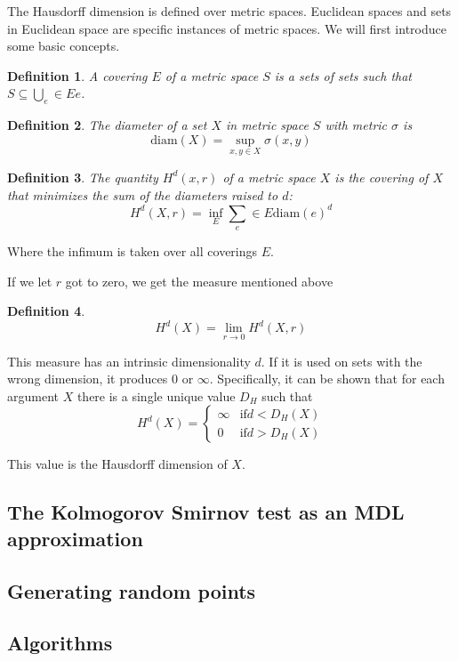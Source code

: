 \documentclass[11pt]{article}
\newtheorem{dfn}{Definition}
\begin{document}
The Hausdorff dimension is defined over metric spaces. Euclidean spaces and sets in Euclidean space are specific instances of metric spaces. We will first introduce some basic concepts.

\begin{dfn}
A covering $E$ of a metric space $S$ is a sets of sets such that $S \subseteq\bigcup_e \in E e$. 
\end{dfn}

\begin{dfn}
The diameter of a set $X$ in metric space $S$ with metric $\sigma$ is
\[
\mbox{diam}(X) = \sup_{x, y \in X}\sigma(x, y)
\]
\end{dfn}

\begin{dfn}
The quantity $H^d(x, r)$ of a metric space $X$ is the covering of $X$ that minimizes the sum of the diameters raised to $d$:
\[
H^d(X, r) = \inf_E \sum_e \in E \mbox{diam}(e)^d
\]  
\end{dfn}

Where the infimum is taken over all coverings $E$.

If we let $r$ got to zero, we get the measure mentioned above

\begin{dfn}
\[
H^d(X) = \lim_{r \rightarrow 0} H^d(X, r)
\] 
\end{dfn}

This measure has an intrinsic dimensionality $d$. If it is used on sets with the wrong dimension, it produces $0$ or $\infty$. Specifically, it can be shown that for each argument $X$ there is a single unique value $D_H$ such that 
\[
H^d(X) = \left \{ 
\begin{array}{rl}
  \infty &\mbox{if} d < D_H(X) \\
  0 &\mbox{if} d > D_H(X)
\end{array} \right.
\]

This value is the Hausdorff dimension of $X$.

\subsection{The Kolmogorov Smirnov test as an MDL approximation}

\subsection{Generating random points}
\subsection{Algorithms}



\end{document}
